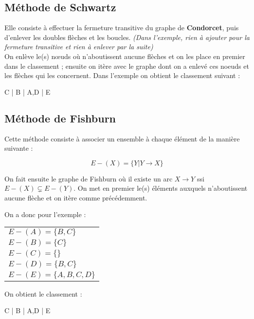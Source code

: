 \documentclass{article}
\begin{document}
\subsection{Méthode de Schwartz}

Elle consiste à effectuer la fermeture transitive du graphe de \textbf{Condorcet}, puis d'enlever les doubles flèches et les boucles. \textit{(Dans l'exemple, rien à ajouter pour la 
fermeture transitive et rien à enlever par la suite)} \\

On enlève le(s) n\oe uds où n'aboutissent aucune flèches et on les place en premier dans le classement ; ensuite on itère avec le graphe dont on a enlevé ces noeuds et les flèches qui 
les concernent. Dans l'exemple on obtient le classement suivant : 

\begin{center}
	\begin{boxedverbatim}
 C
 |
 B
 |
A,D
 |
 E
	\end{boxedverbatim}
\end{center}

\subsection{Méthode de Fishburn}

Cette méthode consiste à associer un ensemble à chaque élément de la manière suivante : 

\[ E-(X) = \{ Y | Y \rightarrow X \}\]

On fait ensuite le graphe de Fishburn où il existe un arc $X \rightarrow Y$ ssi $E-(X) \subsetneq E-(Y)$. On met en premier le(s) éléments auxquels n'aboutissent aucune flèche 
et on itère comme précédemment.

On a donc pour l'exemple : 

\begin{center}
	\begin{tabular}{l}
	$E-(A) = \{B,C\}$ \\
	$E-(B) = \{C\}$ \\
	$E-(C) = \{\}$ \\
	$E-(D) = \{B,C\}$ \\
	$E-(E) = \{A,B,C,D\}$ 
	\end{tabular}
\end{center}

On obtient le classement : 

\begin{center}
	\begin{boxedverbatim}
 C
 |
 B
 |
A,D
 |
 E
	\end{boxedverbatim}
\end{center}
\end{document}
